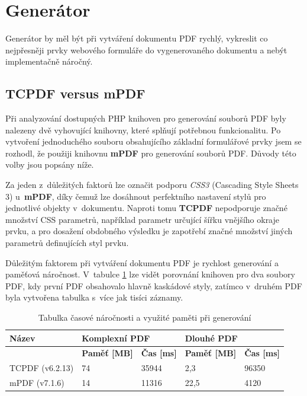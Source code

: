 \section{Generátor}
Generátor by měl být při vytváření dokumentu PDF rychlý, vykreslit co nejpřesněji prvky webového formuláře do vygenerovaného dokumentu a nebýt implementačně náročný.
\subsection{TCPDF versus mPDF}
Při analyzování dostupných PHP knihoven pro generování souborů PDF byly nalezeny dvě vyhovující knihovny, které splňují potřebnou funkcionalitu. Po vytvoření jednoduchého souboru obsahujícího základní formulářové prvky jsem se rozhodl, že použiji knihovnu \textbf{mPDF} pro generování souborů PDF. Důvody této volby jsou popsány níže.
\par
Za jeden z~důležitých faktorů lze označit podporu \textit{CSS3} (Cascading Style Sheets 3) u~\textbf{mPDF}, díky čemuž lze dosáhnout perfektního nastavení stylů pro jednotlivé objekty v~dokumentu. Naproti tomu \textbf{TCPDF} nepodporuje značné množství CSS parametrů, například parametr určující šířku vnějšího okraje prvku, a pro dosažení obdobného výsledku je zapotřebí značné množství jiných parametrů definujících styl prvku.
\par
Důležitým faktorem při vytváření dokumentu PDF je rychlost generování a paměťová náročnost. V~tabulce \ref{tab:table_generators} lze vidět porovnání knihoven pro dva  soubory PDF, kdy první PDF obsahovalo hlavně kaskádové styly, zatímco v~druhém PDF byla vytvořena tabulka s~více jak tisíci záznamy.
\begin{table}[h!]
\centering
\begin{tabular}{|l|l|l|l|l|} 
\hline
\textbf{Název} & \multicolumn{2}{l|}{\textbf{Komplexní PDF}} & \multicolumn{2}{l|}{\textbf{Dlouhé PDF}}  \\ 
\hline
               & \textbf{Paměť [MB]} & \textbf{Čas [ms]}     & \textbf{Paměť [MB]} & \textbf{Čas [ms]}   \\ 
\hline
TCPDF (v6.2.13)          & 74                  & 35944                 & 2,3                 & 96350               \\ 
\hline
mPDF   (v7.1.6)           & 14                  & 11316                 & 22,5                & 4120                \\
\hline
\end{tabular}
\caption{Tabulka časové náročnosti a využité paměti při generování}
\label{tab:table_generators}
\end{table}
